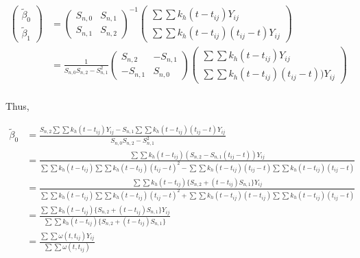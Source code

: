 \documentclass[UTF8,a4paper,10pt]{article}
\begin{document}
\begin{solution}
  \begin{equation*}
    \begin{aligned}
      \begin{pmatrix}
        \tilde{\beta}_0\\
        \tilde{\beta}_1
      \end{pmatrix}
      & =       
      \begin{pmatrix}
        S_{n,0} & S_{n,1}\\
        S_{n,1} & S_{n,2}
      \end{pmatrix}^{-1}
      \begin{pmatrix}
        \sum\sum k_h(t-t_{ij})Y_{ij}
        \\
        \sum\sum k_h(t-t_{ij})(t_{ij}-t)Y_{ij}
      \end{pmatrix}\\
      & = \frac{1}{S_{n,0}S_{n,2}-S_{n,1}^2}
      \begin{pmatrix}
        S_{n,2} & -S_{n,1}\\
        -S_{n,1} & S_{n,0}
      \end{pmatrix}
      \begin{pmatrix}
        \sum\sum k_h(t-t_{ij})Y_{ij}
        \\
        \sum\sum k_h(t-t_{ij})(t_{ij}-t))Y_{ij}
      \end{pmatrix}\\
    \end{aligned}
  \end{equation*}


  Thus,

  \begin{equation*}
    \begin{aligned}
      \tilde{\beta}_0 & = \frac{S_{n,2}\sum\sum k_h(t-t_{ij})Y_{ij}-S_{n,1}\sum\sum k_h(t-t_{ij})(t_{ij}-t)Y_{ij}}{S_{n,0}S_{n,2}-S_{n,1}^2}\\
      & = \frac{\sum\sum k_h(t-t_{ij})(S_{n,2}-S_{n,1}(t_{ij}-t))Y_{ij}}{\sum\sum k_h(t-t_{ij})\sum\sum k_h(t-t_{ij})(t_{ij}-t)^2- \sum\sum k_h(t-t_{ij})(t_{ij}-t)\sum\sum k_h(t-t_{ij})(t_{ij}-t)}\\
      & = \frac{\sum\sum k_h(t-t_{ij})\{S_{n,2}+(t-t_{ij})S_{n,1}\}Y_{ij}}{\sum\sum k_h(t-t_{ij})\sum\sum k_h(t-t_{ij})(t_{ij}-t)^2 + \sum\sum k_h(t-t_{ij})(t-t_{ij})\sum\sum k_h(t-t_{ij})(t_{ij}-t)}\\
      & = \frac{\sum\sum k_h(t-t_{ij})\{S_{n,2}+(t-t_{ij})S_{n,1}\}Y_{ij}}{\sum\sum k_h(t-t_{ij})\{S_{n,2}+(t-t_{ij})S_{n,1}\}}\\
      & = \frac{\sum\sum \omega (t,t_{ij})Y_{ij}}{\sum\sum \omega (t,t_{ij})}\\
    \end{aligned}
  \end{equation*}




  \end{solution}
\end{document}
